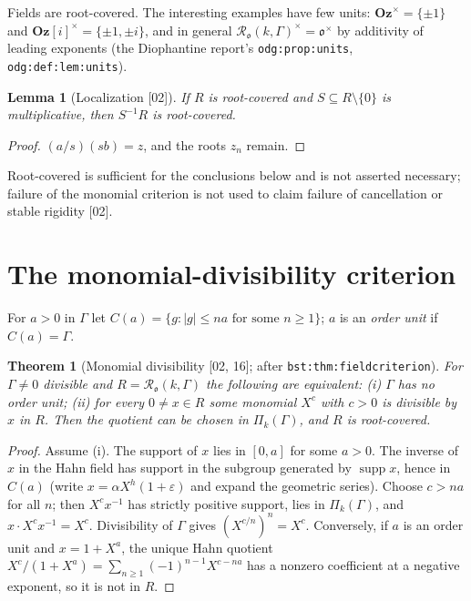 \documentclass[11pt,oneside]{article}
\numberwithin{equation}{section}
\newtheorem{theorem}{Theorem}[section]
\newtheorem{lemma}[lemma]{Lemma}
\theoremstyle{definition}
\theoremstyle{remark}
\newcommand{\Oz}{\mathbf{Oz}}
\newcommand{\Og}{\mathbf{Oz}[i]}
\newcommand{\oo}{\mathfrak o}
\newcommand{\supp}{\operatorname{supp}}
\newcommand{\src}[1]{\textup{\textsf{\small[#1]}}}
\newcommand{\lbl}[1]{\nolinkurl{#1}}
\begin{document}
Fields are root-covered. The interesting examples have few units: $\Oz^\times=\{\pm1\}$
and $\Og^\times=\{\pm1,\pm i\}$, and in general $\mathcal R_\oo(k,\Gamma)^\times=\oo^\times$ by
additivity of leading exponents (the Diophantine report's \lbl{odg:prop:units},
\lbl{odg:def:lem:units}).

\begin{lemma}[Localization \src{02}]\label{opa:par:lem:localize}
If $R$ is root-covered and $S\subseteq R\setminus\{0\}$ is multiplicative, then $S^{-1}R$ is
root-covered.
\end{lemma}
\begin{proof}
$(a/s)(sb)=z$, and the roots $z_n$ remain.
\end{proof}

Root-covered is sufficient for the conclusions below and is not asserted
necessary; failure of the monomial criterion is not used to claim failure of
cancellation or stable rigidity \src{02}.

\section{The monomial-divisibility criterion}\label{opa:par:sec:hahn}

For $a>0$ in $\Gamma$ let $C(a)=\{g:|g|\le na\text{ for some }n\ge1\}$; $a$ is an
\emph{order unit} if $C(a)=\Gamma$.

\begin{theorem}[Monomial divisibility \src{02, 16}; after \lbl{bst:thm:fieldcriterion}]\label{opa:par:thm:scale}
For $\Gamma\ne0$ divisible and $R=\mathcal R_\oo(k,\Gamma)$ the following are equivalent:
\textup{(i)} $\Gamma$ has no order unit; \textup{(ii)} for every $0\ne x\in R$ some
monomial $X^c$ with $c>0$ is divisible by $x$ in $R$. Then the quotient can be chosen
in $\Pi_k(\Gamma)$, and $R$ is root-covered.
\end{theorem}
\begin{proof}
Assume (i). The support of $x$ lies in $[0,a]$ for some $a>0$. The inverse of $x$ in
the Hahn field has support in the subgroup generated by $\supp x$, hence in $C(a)$
(write $x=\alpha X^h(1+\varepsilon)$ and expand the geometric series). Choose $c>na$ for all
$n$; then $X^cx^{-1}$ has strictly positive support, lies in $\Pi_k(\Gamma)$, and
$x\cdot X^cx^{-1}=X^c$. Divisibility of $\Gamma$ gives $(X^{c/n})^n=X^c$. Conversely,
if $a$ is an order unit and $x=1+X^a$, the unique Hahn quotient
$X^c/(1+X^a)=\sum_{n\ge1}(-1)^{n-1}X^{c-na}$ has a nonzero coefficient at a negative
exponent, so it is not in $R$.
\end{proof}
\end{document}
